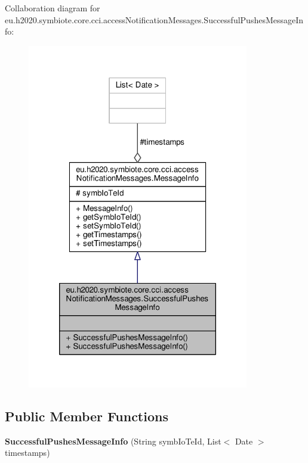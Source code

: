 Collaboration diagram for eu.\+h2020.\+symbiote.\+core.\+cci.\+access\+Notification\+Messages.\+Successful\+Pushes\+Message\+Info\+:
\nopagebreak
\begin{figure}[H]
\begin{center}
\leavevmode
\includegraphics[width=274pt]{classeu_1_1h2020_1_1symbiote_1_1core_1_1cci_1_1accessNotificationMessages_1_1SuccessfulPushesMessageInfo__coll__graph}
\end{center}
\end{figure}
\subsection*{Public Member Functions}
\begin{DoxyCompactItemize}
\item 
\mbox{\label{classeu_1_1h2020_1_1symbiote_1_1core_1_1cci_1_1accessNotificationMessages_1_1SuccessfulPushesMessageInfo_a3a1e4570e1fab72a4a2a718a30d74bf6}} 
{\bfseries Successful\+Pushes\+Message\+Info} (String symb\+Io\+Te\+Id, List$<$ Date $>$ timestamps)
\end{DoxyCompactItemize}
